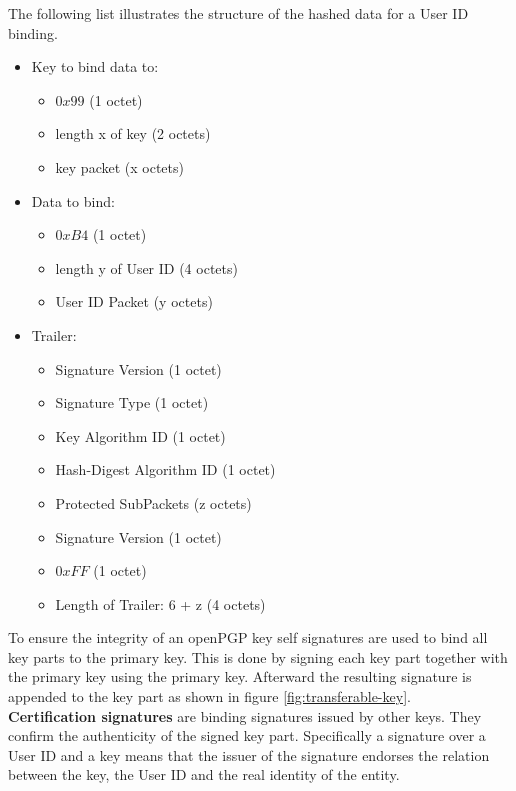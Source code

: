 The following list illustrates the structure of the hashed data for a User ID binding.

\begin{itemize} \label{listing:signature}
	\item Key to bind data to:
	\begin{itemize}
		\item $0x99$ (1 octet)
		\item length x of key (2 octets)
		\item key packet (x octets)
	\end{itemize}
	
	\item Data to bind:
	\begin{itemize}
		\item $0xB4$ (1 octet)
		\item length y of User ID (4 octets)
		\item User ID Packet (y octets)
	\end{itemize}
	
	\item Trailer:
	\begin{itemize}
		\item Signature Version (1 octet)
		\item Signature Type (1 octet)
		\item Key Algorithm ID (1 octet)
		\item Hash-Digest Algorithm ID (1 octet)
		\item Protected SubPackets (z octets)
		\item Signature Version (1 octet) 
		\item $0xFF$ (1 octet)
		\item Length of Trailer: 6 + z (4 octets)
	\end{itemize}
\end{itemize}

To ensure the integrity of an openPGP key self signatures are used to bind all key parts to the primary key. This is done by signing each key part together with the primary key using the primary key. Afterward the resulting signature is appended to the key part as shown in figure \ref{fig:transferable-key}. \\

\textbf{Certification signatures} are binding signatures issued by other keys. They confirm the authenticity of the signed key part. Specifically a signature over a User ID and a key means that the issuer of the signature endorses the relation between the key, the User ID and the real identity of the entity.

